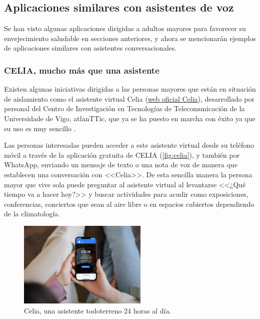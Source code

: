\subsection{Aplicaciones similares con asistentes de voz}

Se han visto algunas aplicaciones dirigidas a adultos mayores para favorecer su envejecimiento saludable en secciones anteriores, y ahora se mencionarán ejemplos de aplicaciones similares con asistentes conversacionales. 

\subsubsection{CELIA, mucho más que una asistente}

Existen algunas iniciativas dirigidas a las personas mayores que están en situación de aislamiento como el asistente virtual Celia (\href{https://celiatecuida.com/}{web oficial Celia}), desarrollado por personal del Centro de Investigación en Tecnologías de Telecomunicación de la Universidade de Vigo, atlanTTic, que ya se ha puesto en marcha con éxito ya que su uso es muy sencillo \parencite{celia-app}.

Las personas interesadas pueden acceder a este asistente virtual desde su teléfono móvil a través de la aplicación gratuita de CELIA (\autoref{fig:celia}), y también por WhatsApp, enviando un mensaje de texto o una nota de voz de manera que establecen una conversación con <<Celia>>. De esta sencilla manera  la persona  mayor que vive sola puede preguntar al asistente virtual al levantarse <<¿Qué tiempo va a hacer hoy?>> y buscar actividades para acudir como exposiciones, conferencias, conciertos que sean al aire libre o en espacios cubiertos dependiendo de la climatología. 

\begin{figure}[H]
    \centering
    \includegraphics[width=0.55\textwidth]{imgs/celia.jpg}
    \caption{Celia, una asistente todoterreno 24 horas al día.}
    \label{fig:celia}
\end{figure}

